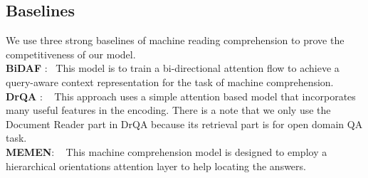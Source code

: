 \documentclass[sigconf]{acmart}
\begin{document}
\subsection{Baselines}
We use three strong baselines of machine reading comprehension to prove the competitiveness of our model.\\
\textbf{BiDAF} : ~This model\cite{seo2016bidirectional} is to train a bi-directional attention flow to achieve a query-aware context representation for the task of machine comprehension.\\
\textbf{DrQA} : ~ This approach\cite{Chen2017Reading} uses a simple attention based model that incorporates many useful features in the encoding. There is a note that we only use the Document Reader part in DrQA because its retrieval part is for open domain QA task. \\
\textbf{MEMEN}: ~ This machine comprehension model\cite{pan2017memen}  is designed to employ a hierarchical orientations attention layer to help locating the answers. 
\end{document}
